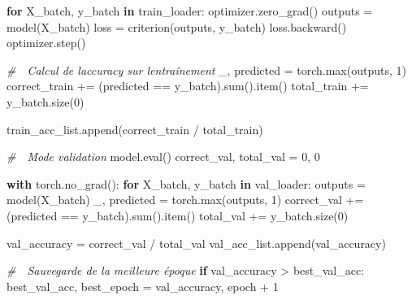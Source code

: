 \documentclass[
]{article}
\newenvironment{Shaded}{}{}
\newcommand{\BuiltInTok}[1]{\textcolor[rgb]{0.00,0.50,0.00}{#1}}
\newcommand{\CommentTok}[1]{\textcolor[rgb]{0.38,0.63,0.69}{\textit{#1}}}
\newcommand{\ControlFlowTok}[1]{\textcolor[rgb]{0.00,0.44,0.13}{\textbf{#1}}}
\newcommand{\DecValTok}[1]{\textcolor[rgb]{0.25,0.63,0.44}{#1}}
\newcommand{\KeywordTok}[1]{\textcolor[rgb]{0.00,0.44,0.13}{\textbf{#1}}}
\newcommand{\NormalTok}[1]{#1}
\newcommand{\OperatorTok}[1]{\textcolor[rgb]{0.40,0.40,0.40}{#1}}
\begin{document}
\begin{Shaded}
\begin{Highlighting}[]
    \ControlFlowTok{for}\NormalTok{ X\_batch, y\_batch }\KeywordTok{in}\NormalTok{ train\_loader:}
\NormalTok{        optimizer.zero\_grad()}
\NormalTok{        outputs }\OperatorTok{=}\NormalTok{ model(X\_batch)}
\NormalTok{        loss }\OperatorTok{=}\NormalTok{ criterion(outputs, y\_batch)}
\NormalTok{        loss.backward()}
\NormalTok{        optimizer.step()}

        \CommentTok{\# 🎯 Calcul de l\textquotesingle{}accuracy sur l\textquotesingle{}entraînement}
\NormalTok{        \_, predicted }\OperatorTok{=}\NormalTok{ torch.}\BuiltInTok{max}\NormalTok{(outputs, }\DecValTok{1}\NormalTok{)}
\NormalTok{        correct\_train }\OperatorTok{+=}\NormalTok{ (predicted }\OperatorTok{==}\NormalTok{ y\_batch).}\BuiltInTok{sum}\NormalTok{().item()}
\NormalTok{        total\_train }\OperatorTok{+=}\NormalTok{ y\_batch.size(}\DecValTok{0}\NormalTok{)}

\NormalTok{    train\_acc\_list.append(correct\_train }\OperatorTok{/}\NormalTok{ total\_train)}

    \CommentTok{\# 🔄 Mode validation}
\NormalTok{    model.}\BuiltInTok{eval}\NormalTok{()}
\NormalTok{    correct\_val, total\_val }\OperatorTok{=} \DecValTok{0}\NormalTok{, }\DecValTok{0}

    \ControlFlowTok{with}\NormalTok{ torch.no\_grad():}
        \ControlFlowTok{for}\NormalTok{ X\_batch, y\_batch }\KeywordTok{in}\NormalTok{ val\_loader:}
\NormalTok{            outputs }\OperatorTok{=}\NormalTok{ model(X\_batch)}
\NormalTok{            \_, predicted }\OperatorTok{=}\NormalTok{ torch.}\BuiltInTok{max}\NormalTok{(outputs, }\DecValTok{1}\NormalTok{)}
\NormalTok{            correct\_val }\OperatorTok{+=}\NormalTok{ (predicted }\OperatorTok{==}\NormalTok{ y\_batch).}\BuiltInTok{sum}\NormalTok{().item()}
\NormalTok{            total\_val }\OperatorTok{+=}\NormalTok{ y\_batch.size(}\DecValTok{0}\NormalTok{)}

\NormalTok{    val\_accuracy }\OperatorTok{=}\NormalTok{ correct\_val }\OperatorTok{/}\NormalTok{ total\_val}
\NormalTok{    val\_acc\_list.append(val\_accuracy)}

    \CommentTok{\# 🎯 Sauvegarde de la meilleure époque}
    \ControlFlowTok{if}\NormalTok{ val\_accuracy }\OperatorTok{\textgreater{}}\NormalTok{ best\_val\_acc:}
\NormalTok{        best\_val\_acc, best\_epoch }\OperatorTok{=}\NormalTok{ val\_accuracy, epoch }\OperatorTok{+} \DecValTok{1}


\end{Highlighting}
\end{Shaded}
\end{document}
